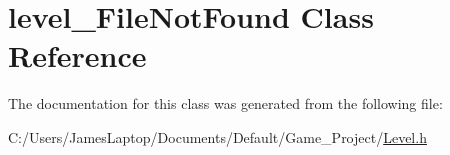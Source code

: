 \hypertarget{classlevel___file_not_found}{}\section{level\+\_\+\+File\+Not\+Found Class Reference}
\label{classlevel___file_not_found}


The documentation for this class was generated from the following file\+:\begin{DoxyCompactItemize}
\item 
C\+:/\+Users/\+James\+Laptop/\+Documents/\+Default/\+Game\+\_\+\+Project/\hyperlink{_level_8h}{Level.\+h}\end{DoxyCompactItemize}
